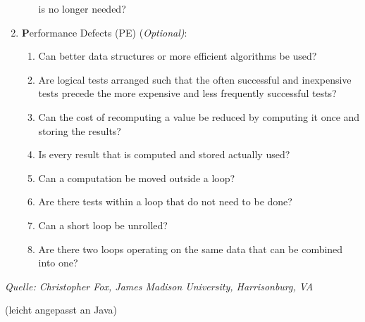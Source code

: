 \begin{enumerate}
\begin{enumerate}
  is no longer needed?
  \end{enumerate}
\item {\textbf Performance Defects (PE)} {(\em Optional)}:
  \begin{enumerate}
  \item Can better data structures or more efficient algorithms be used?
  \item Are logical tests arranged such that the often successful and
  inexpensive tests precede the more expensive and less frequently successful
  tests?
\item Can the cost of recomputing a value be reduced by computing it once and
  storing the results?
\item Is every result that is computed and stored actually used?
\item Can a computation be moved outside a loop?
\item Are there tests within a loop that do not need to be done?
\item Can a short loop be unrolled?
\item Are there two loops operating on the same data that can be combined into
  one?
  \end{enumerate}
\end{enumerate}
{\em Quelle: Christopher Fox, James Madison University, Harrisonburg, VA}

(leicht angepasst an Java)
\newpage
